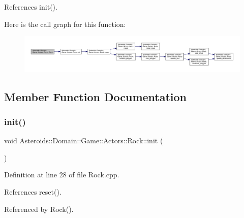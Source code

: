 References init().

Here is the call graph for this function\+:\nopagebreak
\begin{figure}[H]
\begin{center}
\leavevmode
\includegraphics[width=350pt]{classAsteroids_1_1Domain_1_1Game_1_1Actors_1_1Rock_aef8f46670fe5751800b9d76079adb5e5_cgraph}
\end{center}
\end{figure}


\subsection{Member Function Documentation}
\mbox{\label{classAsteroids_1_1Domain_1_1Game_1_1Actors_1_1Rock_a8bdb717103786b8a2e30ea29db791078}} 
\subsubsection{\texorpdfstring{init()}{init()}}
{\footnotesize\ttfamily void Asteroids\+::\+Domain\+::\+Game\+::\+Actors\+::\+Rock\+::init (\begin{DoxyParamCaption}{ }\end{DoxyParamCaption})\hspace{0.3cm}{\ttfamily [protected]}}



Definition at line 28 of file Rock.\+cpp.



References reset().



Referenced by Rock().

